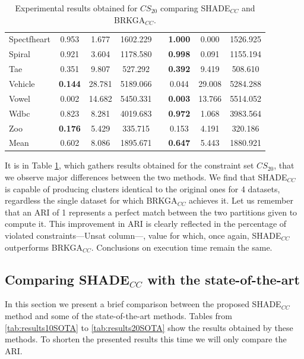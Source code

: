 \documentclass[review]{elsarticle}
\begin{document}
\begin{table}[!h]
{\begin{tabular}{l ccc c ccc}
			Spectfheart & 0.953 & 1.677 & 1602.229 && \textbf{1.000} & 0.000 & 1526.925 \\
			Spiral & 0.921 & 3.604 & 1178.580 && \textbf{0.998} & 0.091 & 1155.194 \\
			Tae & 0.351 & 9.807 & 527.292 && \textbf{0.392} & 9.419 & 508.610 \\
			Vehicle & \textbf{0.144} & 28.781 & 5189.066 && 0.044 & 29.008 & 5284.288 \\
			Vowel & 0.002 & 14.682 & 5450.331 && \textbf{0.003} & 13.766 & 5514.052 \\
			Wdbc & 0.823 & 8.281 & 4019.683 && \textbf{0.972} & 1.068 & 3983.564 \\
			Zoo & \textbf{0.176} & 5.429 & 335.715 && 0.153 & 4.191 & 320.186 \\
			\hline
			Mean & 0.602 & 8.086 & 1895.671 && \textbf{0.647} & 5.443 & 1880.921 \\
			\hline

		\end{tabular}}

	\caption{Experimental results obtained for $CS_{20}$ comparing SHADE$_{CC}$ and BRKGA$_{CC}$.}
	\label{tab:results20}
\end{table}

It is in Table \ref{tab:results20}, which gathers results obtained for the constraint set $CS_{20}$, that we observe major differences between the two methods. We find that SHADE$_{CC}$ is capable of producing clusters identical to the original ones for 4 datasets, regardless the single dataset for which BRKGA$_{CC}$ achieves it. Let us remember that an ARI of 1 represents a perfect match between the two partitions given to compute it. This improvement in ARI is clearly reflected in the percentage of violated constraints---Unsat column---, value for which, once again, SHADE$_{CC}$ outperforms BRKGA$_{CC}$. Conclusions on execution time remain the same.

\subsection{Comparing SHADE$_{CC}$ with the state-of-the-art} \label{sec:SHADEvsSOTA}

In this section we present a brief comparison between the proposed SHADE$_{CC}$ method and some of the state-of-the-art methods. Tables from \ref{tab:results10SOTA} to \ref{tab:results20SOTA} show the results obtained by these methods. To shorten the presented results this time we will only compare the ARI.
\end{document}
